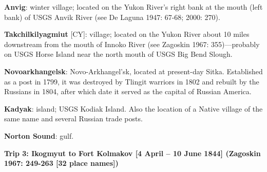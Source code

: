 \begin{hang}
\textbf{Anvig}: winter village; located on the Yukon River’s right bank at the mouth (left bank) of USGS Anvik River (see De Laguna 1947: 67-68; 2000: 270).



\textbf{Takchilkilyagmiut} [CY]: village; located on the Yukon River about 10 miles downstream from the mouth of Innoko River (see Zagoskin 1967: 355)—probably on USGS Horse Island near the north mouth of USGS Big Bend Slough.



\textbf{Novoarkhangelsk}: Novo-Arkhangel’sk, located at present-day Sitka. Established as a post in 1799, it was destroyed by Tlingit warriors in 1802 and rebuilt by the Russians in 1804, after which date it served as the capital of Russian America.



\textbf{Kadyak}: island; USGS Kodiak Island. Also the location of a Native village of the same name and several Russian trade posts.



\textbf{Norton Sound}: gulf.

\end{hang}

\vspace{1cm}
\noindent
\textbf{Trip 3: Ikogmyut to Fort Kolmakov [4 April – 10 June 1844]   (Zagoskin 1967: 249-263 [32 place names]) }
\vspace{6pt}


